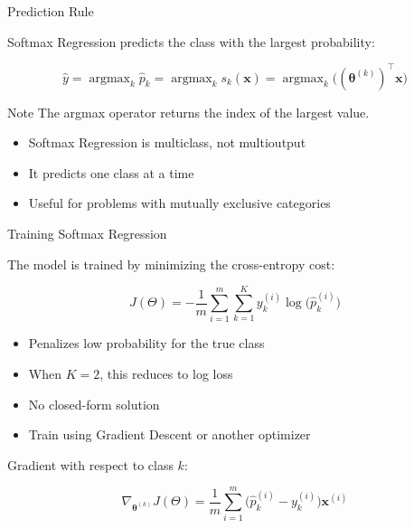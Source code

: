 \documentclass[aspectratio=169]{beamer}
\begin{document}

\begin{frame}{Prediction Rule}

Softmax Regression predicts the class with the largest probability:

\[
\hat{y}
=
\mathop{\mathrm{argmax}}_{k}\hat{p}_k
=
\mathop{\mathrm{argmax}}_{k}s_k(\mathbf{x})
=
\mathop{\mathrm{argmax}}_{k}\big((\bm{\theta}^{(k)})^{\top}\mathbf{x}\big)
\]

\vspace{0.5em}

\begin{exampleblock}{Note}
The argmax operator returns the index of the largest value.
\end{exampleblock}

\vspace{0.5em}

\begin{itemize}
\item Softmax Regression is multiclass, not multioutput
\item It predicts one class at a time
\item Useful for problems with mutually exclusive categories
\end{itemize}

\end{frame}


\begin{frame}{Training Softmax Regression}

The model is trained by minimizing the cross-entropy cost:

\[
J(\Theta)
=
-\frac{1}{m}
\sum_{i=1}^{m}
\sum_{k=1}^{K}
y_k^{(i)}\log\big(\hat{p}_k^{(i)}\big)
\]

\vspace{0.5em}

\begin{itemize}
\item Penalizes low probability for the true class
\item When $K=2$, this reduces to log loss
\item No closed-form solution
\item Train using Gradient Descent or another optimizer
\end{itemize}

\vspace{0.5em}

Gradient with respect to class $k$:

\[
\nabla_{\bm{\theta}^{(k)}}J(\Theta)
=
\frac{1}{m}
\sum_{i=1}^{m}
\big(\hat{p}_k^{(i)} - y_k^{(i)}\big)\mathbf{x}^{(i)}
\]

\end{frame}
\end{document}
